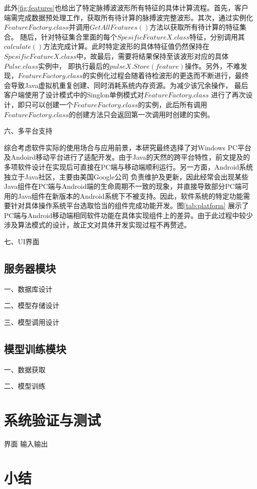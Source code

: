 此外\autoref{fig:features}也给出了特定脉搏波波形所有特征的具体计算流程。首先，客户端需完成数据预处理工作，获取所有待计算的脉搏波完整波形。其次，通过实例化$FeatureFactory.class$并调用$GetAllFeatures()$方法以获取所有待计算的特征集合。
随后，针对特征集合里面的每个$SpesificFeatureX.class$特征，分别调用其$calculate()$方法完成计算。此时特定波形的具体特征值仍然保持在$SpesificFeatureX.class$中，故最后，需要将结果保持至该波形对应的具体$Pulse.class$实例中，
即执行最后的$pulseX.Store(feature)$操作。另外，不难发现，$FeatureFactory.class$的实例化过程会随着待检波形的更迭而不断进行，最终会导致Java虚拟机重复创建、同时消耗系统内存资源。为减少该冗余操作，
最后客户端使用了设计模式中的Singlon单例模式\cite{Li2015}对$FeatureFactory.class$
进行了再次设计，即只可以创建一个$FeatureFactory.class$的实例，此后所有调用$FeatureFactory.class$的创建方法只会返回第一次调用时创建的实例。


六、多平台支持

综合考虑软件实际的使用场合与应用前景，本研究最终选择了对Windows PC平台及Andoird移动平台进行了适配开发。由于Java的天然的跨平台特性，前文提及的多项软件设计在实现后可直接在PC端与移动端顺利运行。另一方面，Android系统独立于Java社区，主要由美国Google公司
负责维护及更新，因此经常会出现某些Java组件在PC端与Android端的生命周期不一致的现象，并直接导致部分PC端可用的Java组件在新版本的Android系统下不被支持。因此，软件系统的特定功能需要针对具体操作系统平台选取恰当的组件完成功能开发。图\autoref{tab:platform}
展示了PC端与Android移动端相同软件功能在具体实现组件上的差异。由于此过程中较少涉及算法模式的设计，故正文对具体开发实现过程不再赘述。



七、UI界面



\subsection{服务器模块}

一、数据库设计

二、模型存储设计

三、模型调用设计

\subsection{模型训练模块}
一、数据获取

二、模型训练

\section{系统验证与测试}
界面
输入输出
\section{小结}